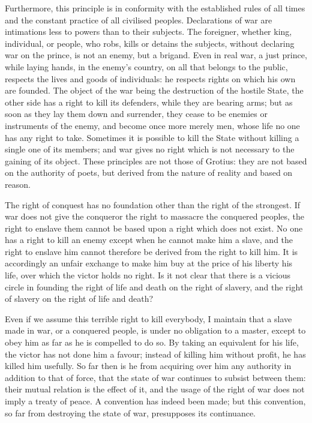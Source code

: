 \documentclass[12pt]{report}
\begin{document}
Furthermore, this principle is in conformity with the established rules of all times and the constant practice of all civilised peoples. Declarations of war are intimations less to powers than to their subjects. The foreigner, whether king, individual, or people, who robs, kills or detains the subjects, without declaring war on the prince, is not an enemy, but a brigand. Even in real war, a just prince, while laying hands, in the enemy's country, on all that belongs to the public, respects the lives and goods of individuals: he respects rights on which his own are founded. The object of the war being the destruction of the hostile State, the other side has a right to kill its defenders, while they are bearing arms; but as soon as they lay them down and surrender, they cease to be enemies or instruments of the enemy, and become once more merely men, whose life no one has any right to take. Sometimes it is possible to kill the State without killing a single one of its members; and war gives no right which is not necessary to the gaining of its object. These principles are not those of Grotius: they are not based on the authority of poets, but derived from the nature of reality and based on reason.

The right of conquest has no foundation other than the right of the strongest. If war does not give the conqueror the right to massacre the conquered peoples, the right to enslave them cannot be based upon a right which does not exist. No one has a right to kill an enemy except when he cannot make him a slave, and the right to enslave him cannot therefore be derived from the right to kill him. It is accordingly an unfair exchange to make him buy at the price of his liberty his life, over which the victor holds no right. Is it not clear that there is a vicious circle in founding the right of life and death on the right of slavery, and the right of slavery on the right of life and death?

Even if we assume this terrible right to kill everybody, I maintain that a slave made in war, or a conquered people, is under no obligation to a master, except to obey him as far as he is compelled to do so. By taking an equivalent for his life, the victor has not done him a favour; instead of killing him without profit, he has killed him usefully. So far then is he from acquiring over him any authority in addition to that of force, that the state of war continues to subsist between them: their mutual relation is the effect of it, and the usage of the right of war does not imply a treaty of peace. A convention has indeed been made; but this convention, so far from destroying the state of war, presupposes its continuance.
\end{document}
